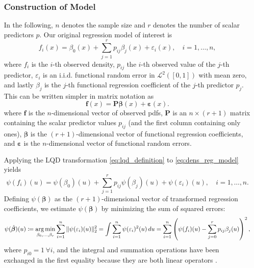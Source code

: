 \subsubsection{Construction of Model}
\label{sec:model_construction}
In the following, $n$ denotes the sample size and $r$ denotes the number of scalar
predictors $p$. Our original regression model of interest is
\begin{equation}
    \label{eq:dens_reg_model}
    f_i(x) = \beta_0(x) + \sum_{j=1}^{r} p_{ij} \beta_j(x) + \varepsilon_i(x), \quad i = 1, \ldots, n,
\end{equation}
where $f_i$ is the $i$-th observed density, $p_{ij}$ the $i$-th observed value of the
$j$-th predictor, $\varepsilon_i$ is an i.i.d. functional random error in $\mathcal{L}^2([0,1])$
with mean zero, and lastly $\beta_j$ is the $j$-th functional regression coefficient of the $j$-th
predictor $p_j$. This can be written simpler in matrix notation as
\begin{equation}
    \label{eq:dens_reg_model_matrix}
    \mathbf{f}(x) = \mathbf{P} \boldsymbol{\beta}(x) + \boldsymbol{\varepsilon}(x).
\end{equation}
where $\mathbf{f}$ is the $n$-dimensional vector of observed pdfs, $\mathbf{P}$ is an $n \times (r+1)$
matrix containing the scalar predictor values $p_{ij}$ (and the first column containing only
ones), $\boldsymbol{\beta}$ is the $(r+1)$-dimensional vector of functional regression coefficients,
and $\boldsymbol{\varepsilon}$ is the $n$-dimensional vector of functional random errors.

Applying the LQD transformation \eqref{eq:lqd_definition} to \eqref{eq:dens_reg_model}
yields
\begin{equation}
    \label{eq:lqd_reg_model}
    \psi(f_i)(u) = \psi(\beta_0)(u) + \sum_{j=1}^{r} p_{ij} \psi(\beta_j)(u) + \psi(\varepsilon_i)(u), \quad i = 1, \ldots, n.
\end{equation}
Defining $\psi(\boldsymbol{\beta})$ as the $(r+1)$-dimensional vector of transformed
regression coefficients, we estimate $\psi(\boldsymbol{\beta})$ by minimizing the sum of
squared errors:
\begin{equation}
    \psi(\hat{\boldsymbol{\beta}})(u)
    \coloneqq \operatorname*{arg\,min}_{\beta_0,\dots, \beta_r} \sum_{i=1}^{n} \|\psi(\varepsilon_i) (u)\|_2^2
    = \int \sum_{i=1}^{n} \psi(\varepsilon_i)^2 (u) \, du
    = \sum_{i=1}^{n} \left( \psi(f_i)(u) - \sum_{j=0}^{r} p_{ij} \beta_j(u) \right)^2,
\end{equation}
where $p_{i0} = 1 \ \forall i$, and the integral and summation operations have been
exchanged in the first equality because they are both linear operators
\parencites[cf.][Chapter~13.4]{RamsaySilverman2005}[][Chapter~5.1]{KokoszkaReimherr2017}.


